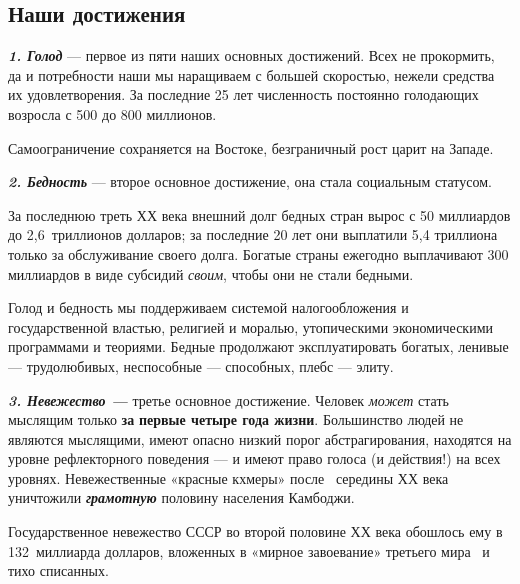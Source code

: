 %
\subsection[Наши достижения]{Наши достижения}

\textbf{\textit{1. Голод}} — первое из пяти наших основных достижений. Всех не прокормить, да и потребности наши мы
наращиваем с большей скоростью, нежели средства их удовлетворения. За последние 25 лет численность постоянно голодающих
возросла с 500 до 800 миллионов.


Самоограничение сохраняется на Востоке, безграничный рост царит на Западе.


\textbf{\textit{2. Бедность}} — второе основное достижение, она стала социальным статусом.


За последнюю треть ХХ века внешний долг бедных стран вырос с 50 миллиардов до 2,6~триллионов долларов; за последние 20
лет они выплатили 5,4 триллиона только за обслуживание своего долга. Богатые страны ежегодно выплачивают 300 миллиардов
в виде субсидий \textit{своим}, чтобы они не стали бедными.


Голод и бедность мы поддерживаем системой налогообложения и государственной властью, религией и моралью, утопическими
экономическими программами и теориями. Бедные продолжают эксплуатировать богатых, ленивые — трудолюбивых, неспособные —
способных, плебс — элиту.


\textbf{\textit{3. Невежество — }}третье основное достижение. Человек \textit{может} стать мыслящим только \textbf{за}
\textbf{первые четыре года жизни}. Большинство людей не являются мыслящими, имеют опасно низкий порог абстрагирования,
находятся на уровне рефлекторного поведения — и имеют право голоса (и действия!) на всех уровнях. Невежественные
«красные кхмеры» после \ середины ХХ века уничтожили \textbf{\textit{грамотную}} половину населения Камбоджи.


Государственное невежество СССР во второй половине ХХ века обошлось ему в 132~миллиарда долларов, вложенных в «мирное
завоевание» третьего мира \ и тихо списанных.


